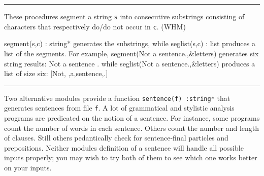 
\vspace{0.25cm}\hrule{}

These procedures segment a string \texttt{s} into consecutive substrings
consisting of characters that respectively do/do not occur in
\texttt{c}. (WHM)

\textsf{segment(s,c)}\textsf{ : string*} generates
the substrings, while \textsf{seglist(s,c) : list} produces a list of
the segments. For example, \textsf{segment({\textquotedbl}Not a
sentence.{\textquotedbl},\&letters)} generates six string results:
{\textquotedbl}Not{\textquotedbl} {\textquotedbl} {\textquotedbl}
{\textquotedbl}a{\textquotedbl} {\textquotedbl} {\textquotedbl}
{\textquotedbl}sentence{\textquotedbl} {\textquotedbl}.{\textquotedbl}
while \textsf{seglist({\textquotedbl}Not a
sentence.{\textquotedbl},\&letters)} produces a list of size six:
[{\textquotedbl}Not{\textquotedbl},{\textquotedbl}
{\textquotedbl},{\textquotedbl}a{\textquotedbl},{\textquotedbl}sentence{\textquotedbl},{\textquotedbl}.{\textquotedbl}]


\vspace{0.25cm}\hrule{}

Two alternative modules provide a function \texttt{sentence(f) :string*}
that generates sentences from file
\texttt{f}. A lot of grammatical and stylistic analysis programs are
predicated on the notion of a sentence. For instance, some programs
count the number of words in each sentence. Others count the number and
length of clauses. Still others pedantically check for sentence-final
particles and prepositions. Neither module{\textquotesingle}s
definition of a sentence will handle all possible inputs properly; you
may wish to try both of them to see which one works better on your
inputs.

